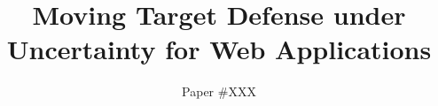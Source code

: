 \documentclass[sigconf]{aamas}  %
\theoremstyle{definition}
\theoremstyle{definition}
\begin{document}
\title{Moving Target Defense under Uncertainty for Web Applications}  %


\author{Paper \#XXX}  %

%
%
%
%
%
%
%
%
\end{document}
